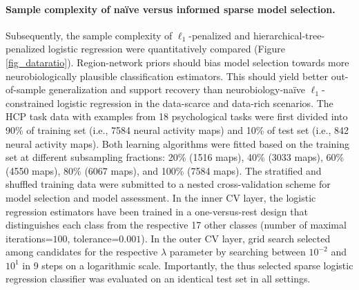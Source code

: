 \documentclass{article} %
\begin{document}
\paragraph{Sample complexity of na\"ive versus informed sparse model selection.}
Subsequently, the sample complexity of
$\ell_1$-penalized and hierarchical-tree-penalized logistic regression
were quantitatively compared (Figure \ref{fig_dataratio}).
Region-network priors should bias model selection towards more
neurobiologically plausible classification estimators.
This should yield better out-of-sample generalization and
support recovery than
neurobiology-na\"ive $\ell_1$-constrained logistic regression
in the data-scarce and data-rich scenarios.
%
The HCP task data with examples from 18
psychological tasks were first divided into
90\% of training set (i.e., 7584 neural activity maps) and
10\% of test set (i.e., 842 neural activity maps).
Both learning algorithms were fitted based on the
training set at different subsampling fractions:
20\% (1516 maps),
40\% (3033 maps),
60\% (4550 maps),
80\% (6067 maps), and
100\% (7584 maps).
%
The stratified and shuffled training data were submitted
to a nested cross-validation scheme
for model selection and model assessment.
In the inner CV layer, the logistic regression estimators
have been trained in a one-versus-rest design that
distinguishes each class from
the respective 17 other classes
(number of maximal iterations=$100$, tolerance=$0.001$).
In the outer CV layer, grid search
selected among candidates for the respective $\lambda$ parameter
by searching between $10^{-2}$ and $10^{1}$ in 9 steps on a logarithmic scale.
Importantly, the thus selected sparse logistic regression classifier was
evaluated on an identical test set in all settings.
\end{document}
